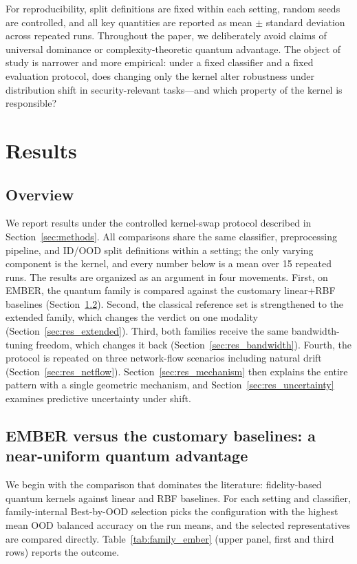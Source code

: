 \documentclass[journal]{IEEEtran}
\begin{document}
For reproducibility, split definitions are fixed within each setting, random seeds are controlled, and all key quantities are reported as mean $\pm$ standard deviation across repeated runs. Throughout the paper, we deliberately avoid claims of universal dominance or complexity-theoretic quantum advantage. The object of study is narrower and more empirical: under a fixed classifier and a fixed evaluation protocol, does changing only the kernel alter robustness under distribution shift in security-relevant tasks---and which property of the kernel is responsible?

\section{Results}
\label{sec:results}

\subsection{Overview}

We report results under the controlled kernel-swap protocol described in Section~\ref{sec:methods}. All comparisons share the same classifier, preprocessing pipeline, and ID/OOD split definitions within a setting; the only varying component is the kernel, and every number below is a mean over 15 repeated runs. The results are organized as an argument in four movements. First, on EMBER, the quantum family is compared against the customary linear+RBF baselines (Section~\ref{sec:res_baselines}). Second, the classical reference set is strengthened to the extended family, which changes the verdict on one modality (Section~\ref{sec:res_extended}). Third, both families receive the same bandwidth-tuning freedom, which changes it back (Section~\ref{sec:res_bandwidth}). Fourth, the protocol is repeated on three network-flow scenarios including natural drift (Section~\ref{sec:res_netflow}). Section~\ref{sec:res_mechanism} then explains the entire pattern with a single geometric mechanism, and Section~\ref{sec:res_uncertainty} examines predictive uncertainty under shift.

\subsection{EMBER versus the customary baselines: a near-uniform quantum advantage}
\label{sec:res_baselines}

We begin with the comparison that dominates the literature: fidelity-based quantum kernels against linear and RBF baselines. For each setting and classifier, family-internal Best-by-OOD selection picks the configuration with the highest mean OOD balanced accuracy on the run means, and the selected representatives are compared directly. Table~\ref{tab:family_ember} (upper panel, first and third rows) reports the outcome.
\end{document}
